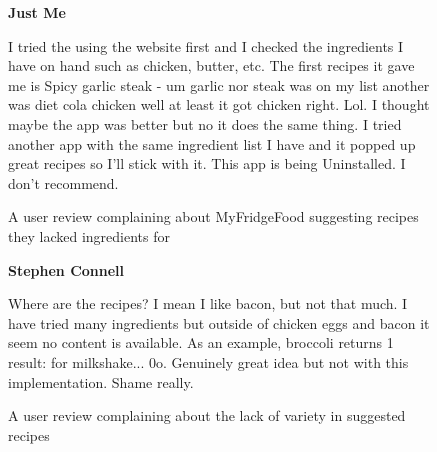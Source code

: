 \begin{figure}[H]
    \caption{A user review complaining about MyFridgeFood suggesting recipes they lacked ingredients for}
    \label{fig:review_missing_ingredients}

    \textbf{Just Me} \dingstarfull \dingstarempty \dingstarempty \dingstarempty \dingstarempty

    I tried the using the website first and I checked the ingredients I have on hand such as chicken,
    butter, etc. The first recipes it gave me is Spicy garlic steak - um garlic nor steak was on my list another was
    diet cola chicken well at least it got chicken right. Lol. I thought maybe the app was better but no it does the same thing.
    I tried another app with the same ingredient list I have and it popped up great recipes so I'll stick with it.
    This app is being Uninstalled. I don't recommend.
\end{figure}

\begin{figure}[H]
    \caption{A user review complaining about the lack of variety in suggested recipes}
    \label{fig:review_lack_variety}

    \textbf{Stephen Connell} \dingstarfull \dingstarfull \dingstarempty \dingstarempty \dingstarempty

    Where are the recipes? I mean I like bacon, but not that much. I have tried many ingredients
    but outside of chicken eggs and bacon it seem no content is available. As an example,
    broccoli returns 1 result: for milkshake... 0\textunderscore o. Genuinely great idea but not with this
    implementation. Shame really.
\end{figure}
